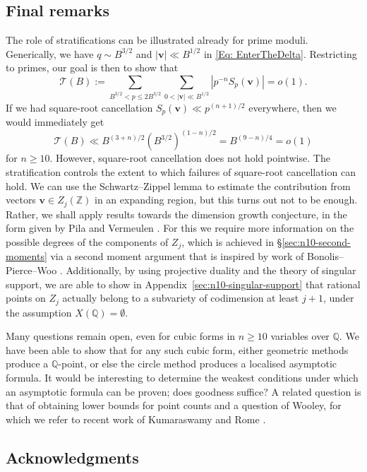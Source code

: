 \documentclass[a4paper,11pt, twoside,reqno]{amsart}
\theoremstyle{plain}
\theoremstyle{definition}
\theoremstyle{remark}
\newcommand{\bfv}{\bm{v}}
\newcommand{\ZZ}{\mathbb{Z}}
\newcommand{\QQ}{\mathbb{Q}}
\renewcommand{\leq}{\leqslant}
\renewcommand{\ge}{\geqslant}
\numberwithin{equation}{section}
\begin{document}
\subsection*{Final remarks}
The role of stratifications can be illustrated already
for prime moduli.
Generically, we have $q\sim B^{3/2}$ and $|\bm{v}|\ll B^{1/2}$  in \eqref{Eq: EnterTheDelta}. Restricting to primes, our goal is then to show that
\[
\mathcal{T}(B) := \sum_{B^{3/2}<p\leq 2B^{3/2}}
\sum_{0<|\bm{v}|\ll B^{1/2}}
|p^{-n} S_p(\bfv)|
= o(1).
\]
If we had square-root cancellation $S_p(\bfv) \ll p^{(n+1)/2}$ everywhere,
then we would immediately get
$$\mathcal{T}(B) \ll B^{(3+n)/2} (B^{3/2})^{(1-n)/2}
= B^{(9-n)/4} = o(1)$$
for $n\ge 10$.
However, square-root cancellation does not hold pointwise.
The stratification
controls the extent to which failures of square-root cancellation can hold.
We can use the Schwartz--Zippel lemma to estimate the contribution from vectors 
$\bm{v}\in Z_j(\ZZ)$ in an expanding region, but this turns out not to be  enough. Rather, we shall  apply results towards the dimension growth conjecture, in the form given by Pila \cite{Pila} and Vermeulen \cite{Vermeulen}. For this we require more information on the possible degrees of the components of $Z_j$,
which is achieved
in \S\ref{sec:n10-second-moments}
via a second moment argument  that is inspired by work of
Bonolis--Pierce--Woo \cite{woo}.
Additionally,  by using projective duality and the  theory of singular support, we are able to show 
in Appendix~\ref{sec:n10-singular-support}
that rational points on $Z_j$ actually belong to a 
subvariety of codimension at least $j+1$,
under the assumption $X(\QQ)=\emptyset$. 

Many questions remain open, even for cubic forms in $n\ge 10$ variables over $\QQ$.
We have been able to show that for any such cubic form,
either geometric methods produce a $\QQ$-point,
or else the circle method produces a localised asymptotic formula.
It would be interesting to determine the weakest conditions
under which an asymptotic formula can be proven;
does goodness suffice?
A related question is that of obtaining lower bounds for point counts and a question of Wooley,
for which we refer to recent work of Kumaraswamy and Rome \cite{nick}.

\subsection*{Acknowledgments}
\end{document}
